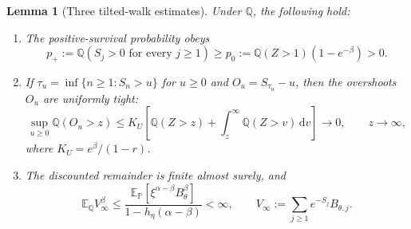 \documentclass[11pt,a4paper]{article}
\numberwithin{equation}{section}
\newtheorem{lemma}[theorem]{Lemma}
\theoremstyle{remark}
\newcommand{\E}{\mathbb E}
\newcommand{\Pp}{\mathbb P}
\newcommand{\Q}{\mathbb Q}
\newcommand{\dd}{\,\mathrm d}
\begin{document}
\begin{lemma}[Three tilted-walk estimates]\label{lem:tilted-estimates}
Under $\Q$, the following hold:
\begin{enumerate}[label=\textnormal{(\alph*)}]
\item The positive-survival probability obeys
\begin{equation}
 p_+:=\Q(S_j>0\text{ for every }j\ge1)
 \ge p_0:=\Q(Z>1)(1-e^{-\beta})>0.\label{eq:survival}
\end{equation}
\item If $\tau_u=\inf\{n\ge1:S_n>u\}$ for $u\ge0$ and
$O_u=S_{\tau_u}-u$, then the overshoots $O_u$ are uniformly tight:
\begin{equation}
 \sup_{u\ge0}\Q(O_u>z)
 \le K_U\left[\Q(Z>z)+\int_z^\infty\Q(Z>v)\dd v\right]
 \longrightarrow0,\qquad z\to\infty,\label{eq:overshoot-final}
\end{equation}
where $K_U=e^\beta/(1-r)$.
\item The discounted remainder is finite almost surely, and
\begin{equation}
 \E_\Q V_\infty^\beta
 \le\frac{\E_\Pp[\xi^{\alpha-\beta}B_\theta^\beta]}
             {1-h_\eta(\alpha-\beta)}<\infty,
 \qquad V_\infty:=\sum_{j\ge1}e^{-S_j}B_{\theta,j}.
 \label{eq:V-infinite}
\end{equation}
\end{enumerate}
\end{lemma}
\end{document}
